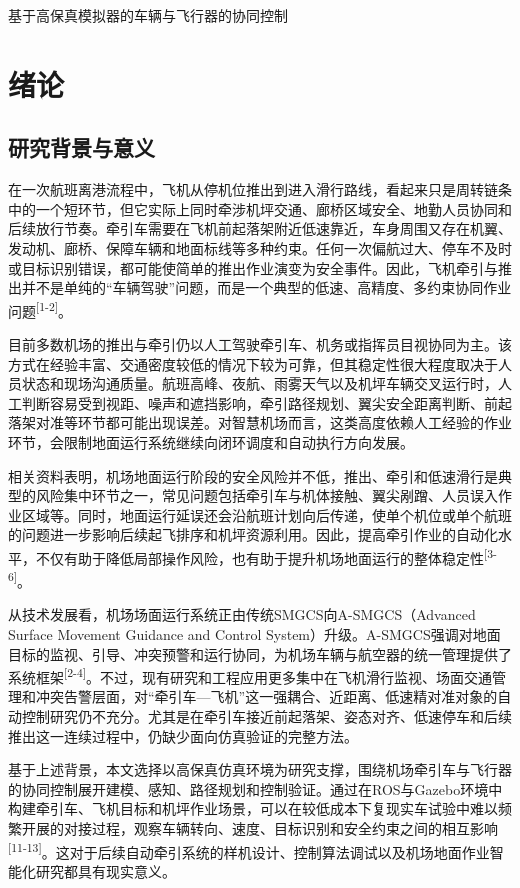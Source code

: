 \begin{center}{\heiti{} 基于高保真模拟器的车辆与飞行器的协同控制}\end{center}

\section{绪论}

\subsection{研究背景与意义}

在一次航班离港流程中，飞机从停机位推出到进入滑行路线，看起来只是周转链条中的一个短环节，但它实际上同时牵涉机坪交通、廊桥区域安全、地勤人员协同和后续放行节奏。牵引车需要在飞机前起落架附近低速靠近，车身周围又存在机翼、发动机、廊桥、保障车辆和地面标线等多种约束。任何一次偏航过大、停车不及时或目标识别错误，都可能使简单的推出作业演变为安全事件。因此，飞机牵引与推出并不是单纯的``车辆驾驶''问题，而是一个典型的低速、高精度、多约束协同作业问题\textsuperscript{[1-2]}。

目前多数机场的推出与牵引仍以人工驾驶牵引车、机务或指挥员目视协同为主。该方式在经验丰富、交通密度较低的情况下较为可靠，但其稳定性很大程度取决于人员状态和现场沟通质量。航班高峰、夜航、雨雾天气以及机坪车辆交叉运行时，人工判断容易受到视距、噪声和遮挡影响，牵引路径规划、翼尖安全距离判断、前起落架对准等环节都可能出现误差。对智慧机场而言，这类高度依赖人工经验的作业环节，会限制地面运行系统继续向闭环调度和自动执行方向发展。

相关资料表明，机场地面运行阶段的安全风险并不低，推出、牵引和低速滑行是典型的风险集中环节之一，常见问题包括牵引车与机体接触、翼尖剐蹭、人员误入作业区域等。同时，地面运行延误还会沿航班计划向后传递，使单个机位或单个航班的问题进一步影响后续起飞排序和机坪资源利用。因此，提高牵引作业的自动化水平，不仅有助于降低局部操作风险，也有助于提升机场地面运行的整体稳定性\textsuperscript{[3-6]}。

从技术发展看，机场场面运行系统正由传统SMGCS向A-SMGCS（Advanced Surface
Movement Guidance and Control
System）升级。A-SMGCS强调对地面目标的监视、引导、冲突预警和运行协同，为机场车辆与航空器的统一管理提供了系统框架\textsuperscript{[2-4]}。不过，现有研究和工程应用更多集中在飞机滑行监视、场面交通管理和冲突告警层面，对``牵引车---飞机''这一强耦合、近距离、低速精对准对象的自动控制研究仍不充分。尤其是在牵引车接近前起落架、姿态对齐、低速停车和后续推出这一连续过程中，仍缺少面向仿真验证的完整方法。

基于上述背景，本文选择以高保真仿真环境为研究支撑，围绕机场牵引车与飞行器的协同控制展开建模、感知、路径规划和控制验证。通过在ROS与Gazebo环境中构建牵引车、飞机目标和机坪作业场景，可以在较低成本下复现实车试验中难以频繁开展的对接过程，观察车辆转向、速度、目标识别和安全约束之间的相互影响\textsuperscript{[11-13]}。这对于后续自动牵引系统的样机设计、控制算法调试以及机场地面作业智能化研究都具有现实意义。

